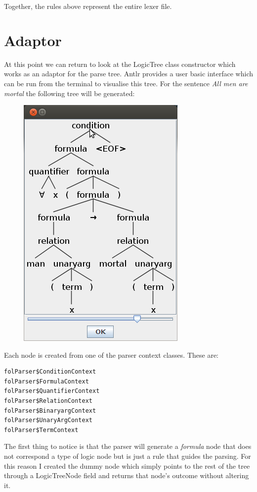 \documentclass{report}
\begin{document}
Together, the rules above represent the entire lexer file.

\section{Adaptor}
At this point we can return to look at the LogicTree class constructor which 
works as an adaptor for the parse tree. Antlr provides a user basic interface 
which can be run from the terminal to visualise this tree. For the sentence 
\emph{All men are mortal} the following tree will be generated: \newpage
\begin{figure}[h!]
\centering \includegraphics[scale=0.5]{antlr.png}
\end{figure}
\noindent Each node is created from one of the parser context classes. 
These are: 
\begin{verbatim}
folParser$ConditionContext
folParser$FormulaContext
folParser$QuantifierContext
folParser$RelationContext
folParser$BinaryargContext
folParser$UnaryArgContext
folParser$TermContext
\end{verbatim}
The first thing to notice is that the parser will generate a \emph{formula} node 
that does not correspond a type of logic node but is just a rule that guides the 
parsing. For this reason I created the dummy node which simply points to the 
rest of the tree through a LogicTreeNode field and returns that node's outcome 
without altering it. 
\end{document}
